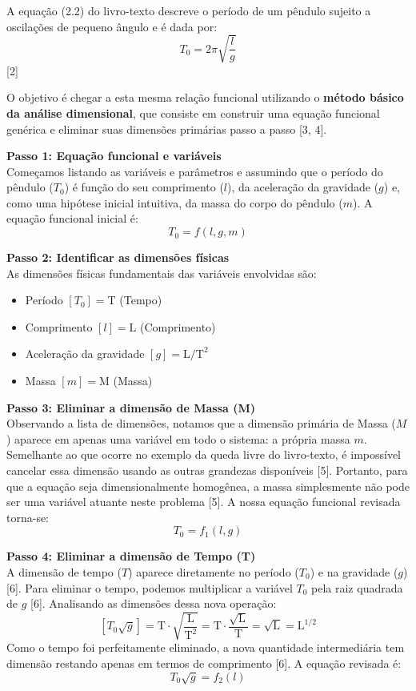 A equação (2.2) do livro-texto descreve o período de um pêndulo sujeito a oscilações de pequeno ângulo e é dada por:
$$ T_0 = 2\pi\sqrt{\frac{l}{g}} $$ [2]

O objetivo é chegar a esta mesma relação funcional utilizando o \textbf{método básico da análise dimensional}, que consiste em construir uma equação funcional genérica e eliminar suas dimensões primárias passo a passo [3, 4].

\vspace{0.3cm}
\textbf{Passo 1: Equação funcional e variáveis} \\
Começamos listando as variáveis e parâmetros e assumindo que o período do pêndulo ($T_0$) é função do seu comprimento ($l$), da aceleração da gravidade ($g$) e, como uma hipótese inicial intuitiva, da massa do corpo do pêndulo ($m$). A equação funcional inicial é:
$$ T_0 = f(l, g, m) $$

\textbf{Passo 2: Identificar as dimensões físicas} \\
As dimensões físicas fundamentais das variáveis envolvidas são:
\begin{itemize}
    \item Período $[T_0] = \text{T}$ (Tempo)
    \item Comprimento $[l] = \text{L}$ (Comprimento)
    \item Aceleração da gravidade $[g] = \text{L/T}^2$
    \item Massa $[m] = \text{M}$ (Massa)
\end{itemize}

\textbf{Passo 3: Eliminar a dimensão de Massa (M)} \\
Observando a lista de dimensões, notamos que a dimensão primária de Massa ($M$) aparece em apenas uma variável em todo o sistema: a própria massa $m$. Semelhante ao que ocorre no exemplo da queda livre do livro-texto, é impossível cancelar essa dimensão usando as outras grandezas disponíveis [5]. Portanto, para que a equação seja dimensionalmente homogênea, a massa simplesmente não pode ser uma variável atuante neste problema [5]. A nossa equação funcional revisada torna-se:
$$ T_0 = f_1(l, g) $$

\textbf{Passo 4: Eliminar a dimensão de Tempo (T)} \\
A dimensão de tempo ($T$) aparece diretamente no período ($T_0$) e na gravidade ($g$) [6]. Para eliminar o tempo, podemos multiplicar a variável $T_0$ pela raiz quadrada de $g$ [6]. 
Analisando as dimensões dessa nova operação:
$$ \left[ T_0\sqrt{g} \right] = \text{T} \cdot \sqrt{\frac{\text{L}}{\text{T}^2}} = \text{T} \cdot \frac{\sqrt{\text{L}}}{\text{T}} = \sqrt{\text{L}} = \text{L}^{1/2} $$
Como o tempo foi perfeitamente eliminado, a nova quantidade intermediária tem dimensão restando apenas em termos de comprimento [6]. A equação revisada é:
$$ T_0\sqrt{g} = f_2(l) $$

